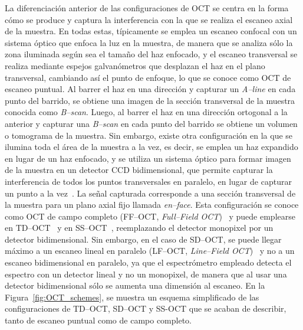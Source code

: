 \documentclass[letter, 12 pt]{article}
\begin{document}
La diferenciación anterior de las configuraciones de OCT se centra en la forma cómo se produce y captura la interferencia con la que se realiza el escaneo axial de la muestra. En todas estas, típicamente se emplea un escaneo confocal con un sistema óptico que enfoca la luz en la muestra, de manera que se analiza sólo la zona iluminada según sea el tamaño del haz enfocado, y el escaneo transversal se realiza mediante espejos galvanómetros que desplazan el haz en el plano transversal, cambiando así el punto de enfoque, lo que se conoce como OCT de escaneo puntual. Al barrer el haz en una dirección y capturar un \textit{A--line} en cada punto del barrido, se obtiene una imagen de la sección transversal de la muestra conocida como \textit{B--scan}. Luego, al barrer el haz en una dirección ortogonal a la anterior y capturar una \textit{B--scan} en cada punto del barrido se obtiene un volumen o tomograma de la muestra. Sin embargo, existe otra configuración en la que se ilumina toda el área de la muestra a la vez, es decir, se emplea un haz expandido en lugar de un haz enfocado, y se utiliza un sistema óptico para formar imagen de la muestra en un detector CCD bidimensional, que permite capturar la interferencia de todos los puntos transversales en paralelo, en lugar de capturar un punto a la vez~\cite{Dubois2006_Full}. La señal capturada corresponde a una sección transversal de la muestra para un plano axial fijo llamada \textit{en--face}. Esta configuración se conoce como OCT de campo completo (FF--OCT, \textit{Full--Field OCT})~\cite{Dubois2006_Full} y puede emplearse en TD--OCT~\cite{Dubois2004_Ultrahigh-resolution} y en SS--OCT~\cite{Fergusson2010_vitro}, reemplazando el detector monopixel por un detector bidimensional. Sin embargo, en el caso de SD--OCT, se puede llegar máximo a un escaneo lineal en paralelo (LF--OCT, \textit{Line--Field OCT})~\cite{Nakamura2007_High-speed} y no a un escaneo bidimensional en paralelo, ya que el espectrómetro empleado detecta el espectro con un detector lineal y no un monopixel, de manera que al usar una detector bidimensional sólo se aumenta una dimensión al escaneo. En la Figura~\ref{fig:OCT_schemes}, se muestra un esquema simplificado de las configuraciones de TD--OCT, SD--OCT y SS-OCT que se acaban de describir, tanto de escaneo puntual como de campo completo. \\
\end{document}
